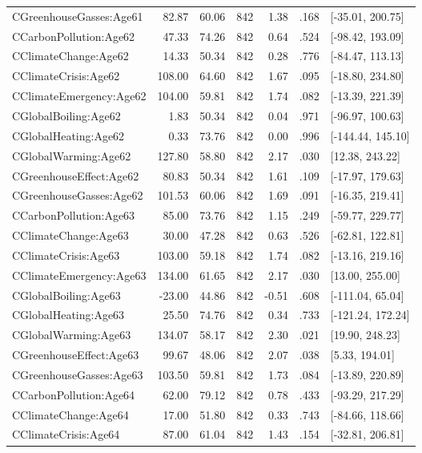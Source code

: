 \begin{table}[ht]
\begin{tabular}{lrrrrrl}
  CGreenhouseGasses:Age61 & 82.87 & 60.06 & 842 & 1.38 & .168 & [-35.01, 200.75] \\ 
  CCarbonPollution:Age62 & 47.33 & 74.26 & 842 & 0.64 & .524 & [-98.42, 193.09] \\ 
  CClimateChange:Age62 & 14.33 & 50.34 & 842 & 0.28 & .776 & [-84.47, 113.13] \\ 
  CClimateCrisis:Age62 & 108.00 & 64.60 & 842 & 1.67 & .095 & [-18.80, 234.80] \\ 
  CClimateEmergency:Age62 & 104.00 & 59.81 & 842 & 1.74 & .082 & [-13.39, 221.39] \\ 
  CGlobalBoiling:Age62 & 1.83 & 50.34 & 842 & 0.04 & .971 & [-96.97, 100.63] \\ 
  CGlobalHeating:Age62 & 0.33 & 73.76 & 842 & 0.00 & .996 & [-144.44, 145.10] \\ 
  CGlobalWarming:Age62 & 127.80 & 58.80 & 842 & 2.17 & .030 & [12.38, 243.22] \\ 
  CGreenhouseEffect:Age62 & 80.83 & 50.34 & 842 & 1.61 & .109 & [-17.97, 179.63] \\ 
  CGreenhouseGasses:Age62 & 101.53 & 60.06 & 842 & 1.69 & .091 & [-16.35, 219.41] \\ 
  CCarbonPollution:Age63 & 85.00 & 73.76 & 842 & 1.15 & .249 & [-59.77, 229.77] \\ 
  CClimateChange:Age63 & 30.00 & 47.28 & 842 & 0.63 & .526 & [-62.81, 122.81] \\ 
  CClimateCrisis:Age63 & 103.00 & 59.18 & 842 & 1.74 & .082 & [-13.16, 219.16] \\ 
  CClimateEmergency:Age63 & 134.00 & 61.65 & 842 & 2.17 & .030 & [13.00, 255.00] \\ 
  CGlobalBoiling:Age63 & -23.00 & 44.86 & 842 & -0.51 & .608 & [-111.04, 65.04] \\ 
  CGlobalHeating:Age63 & 25.50 & 74.76 & 842 & 0.34 & .733 & [-121.24, 172.24] \\ 
  CGlobalWarming:Age63 & 134.07 & 58.17 & 842 & 2.30 & .021 & [19.90, 248.23] \\ 
  CGreenhouseEffect:Age63 & 99.67 & 48.06 & 842 & 2.07 & .038 & [5.33, 194.01] \\ 
  CGreenhouseGasses:Age63 & 103.50 & 59.81 & 842 & 1.73 & .084 & [-13.89, 220.89] \\ 
  CCarbonPollution:Age64 & 62.00 & 79.12 & 842 & 0.78 & .433 & [-93.29, 217.29] \\ 
  CClimateChange:Age64 & 17.00 & 51.80 & 842 & 0.33 & .743 & [-84.66, 118.66] \\ 
  CClimateCrisis:Age64 & 87.00 & 61.04 & 842 & 1.43 & .154 & [-32.81, 206.81] \\ 

\end{tabular}
\end{table}
